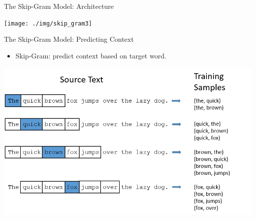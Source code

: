 \documentclass[professionalfonts, xcolor={usenames,svgnames,x11names,table}]{beamer}
\begin{document}
\begin{frame}{The Skip-Gram Model: Architecture}

\begin{center}
        \texttt{[image: ./img/skip\_gram3]}
\end{center}

\vspace{-0.2cm}
\end{frame}



\begin{frame}{The Skip-Gram Model: Predicting Context}

	\begin{itemize}
	\item Skip-Gram: predict \alert{context} based on \alert{target} word.
	\end{itemize}

\begin{center}
        \includegraphics[width=1\linewidth]{./img/skip_gram_training}
\end{center}
\end{frame}
\end{document}
